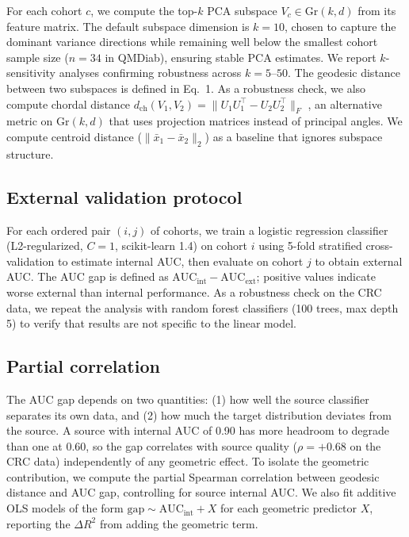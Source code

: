 \documentclass{article}
\begin{document}
For each cohort $c$, we compute the top-$k$ PCA subspace $V_c \in \mathrm{Gr}(k, d)$ from its feature matrix. The default subspace dimension is $k = 10$, chosen to capture the dominant variance directions while remaining well below the smallest cohort sample size ($n = 34$ in QMDiab), ensuring stable PCA estimates. We report $k$-sensitivity analyses confirming robustness across $k = 5$--$50$. The geodesic distance between two subspaces is defined in Eq.~1. As a robustness check, we also compute chordal distance $d_{\mathrm{ch}}(V_1, V_2) = \|U_1 U_1^\top - U_2 U_2^\top\|_F$ \citep{conway1996functions}, an alternative metric on $\mathrm{Gr}(k, d)$ that uses projection matrices instead of principal angles. We compute centroid distance ($\|\bar{x}_1 - \bar{x}_2\|_2$) as a baseline that ignores subspace structure.

\subsection{External validation protocol}

For each ordered pair $(i, j)$ of cohorts, we train a logistic regression classifier (L2-regularized, $C = 1$, scikit-learn 1.4) on cohort $i$ using 5-fold stratified cross-validation to estimate internal AUC, then evaluate on cohort $j$ to obtain external AUC. The AUC gap is defined as $\text{AUC}_{\mathrm{int}} - \text{AUC}_{\mathrm{ext}}$; positive values indicate worse external than internal performance. As a robustness check on the CRC data, we repeat the analysis with random forest classifiers (100 trees, max depth 5) to verify that results are not specific to the linear model.

\subsection{Partial correlation}

The AUC gap depends on two quantities: (1) how well the source classifier separates its own data, and (2) how much the target distribution deviates from the source. A source with internal AUC of 0.90 has more headroom to degrade than one at 0.60, so the gap correlates with source quality ($\rho = +0.68$ on the CRC data) independently of any geometric effect. To isolate the geometric contribution, we compute the partial Spearman correlation between geodesic distance and AUC gap, controlling for source internal AUC. We also fit additive OLS models of the form $\mathrm{gap} \sim \mathrm{AUC_{int}} + X$ for each geometric predictor $X$, reporting the $\Delta R^2$ from adding the geometric term.
\end{document}
